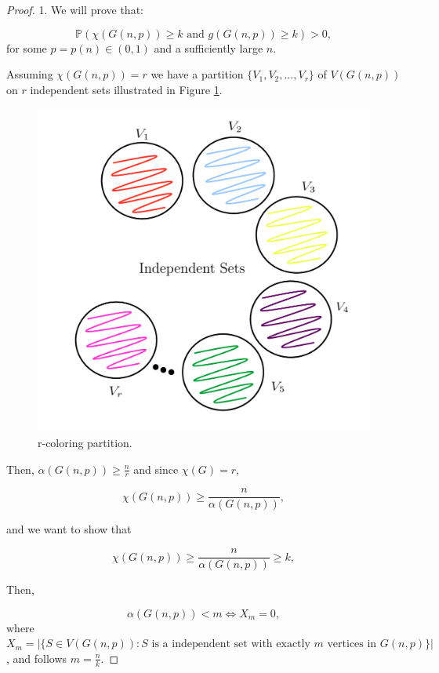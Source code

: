 \documentclass[12pt,twoside,a4paper]{book}
\numberwithin{equation}{section}
\theoremstyle{remark}
\begin{document}
\begin{proof} 1.
We will prove that:

$$\mathbb{P}(\chi(G(n,p)) \geq k \text{ and } g(G(n,p)) \geq k) > 0 ,$$
for some $p =p(n) \in (0,1)$ and a sufficiently large $n$.

Assuming $\chi(G(n,p)) = r$ we have a partition $\{V_1,V_2,...,V_r\}$ of $V(G(n,p))$ on $r$ independent sets illustrated in Figure \ref{fig:r-partition}.
 
\begin{figure}[!htb]
     \centering
     \includegraphics[scale=1]{Figuras/r-partion.jpg}
     \caption{r-coloring partition. }
     \label{fig:r-partition}
\end{figure}

Then, $\alpha (G(n,p)) \geq \frac{n}{r}$ and since $\chi(G)=r$,

$$\chi(G(n,p)) \geq \frac{n}{\alpha(G(n,p))},$$

and we want to show that

$$\chi(G(n,p)) \geq \frac{n}{\alpha(G(n,p))} \geq k ,$$

Then,

$$\alpha(G(n,p)) < m \iff X_m=0 ,$$
where 
$X_m = \big|\{S\in V(G(n,p))\colon \text{$S$ is a independent set with exactly $m$ vertices in $G(n,p)$}\}\big|$,
and follows $m = \frac{n}{k}$. 


\end{proof}
\end{document}
